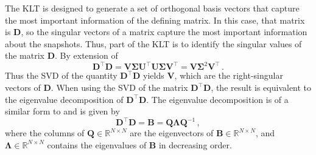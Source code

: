 The KLT is designed to generate a set of orthogonal basis vectors that capture 
the most important information of the defining matrix.  In this case, that 
matrix is $\mathbf{D}$, so the singular vectors of a matrix capture the most
important information about the snapshots.  Thus, part of the KLT is to identify 
the singular values of the matrix $\mathbf{D}$.  By extension of 
\begin{equation}
    \mathbf{D}^{\intercal}\mathbf{D}  = \mathbf{V} \mathbf{\Sigma} 
    \mathbf{U}^{\intercal} \mathbf{U} \mathbf{\Sigma} \mathbf{V}^{\intercal} = 
    \mathbf{V} \mathbf{\Sigma}^2 \mathbf{V}^{\intercal} \, .
    \label{eq:find_eigenvalues}
\end{equation}
Thus the SVD of the quantity $\mathbf{D}^{\intercal}\mathbf{D}$ yields 
$\mathbf{V}$, which are the right-singular vectors of $\mathbf{D}$.  When 
using the SVD of the matrix $\mathbf{D}^{\intercal}\mathbf{D}$, the result 
is equivalent to the eigenvalue decomposition of 
$\mathbf{D}^{\intercal}\mathbf{D}$.  The eigenvalue decomposition is of a similar form to 
 and is given by
\begin{equation}
    \mathbf{D}^{\intercal}\mathbf{D} = \mathbf{B} = 
    \mathbf{Q}\mathbf{\Lambda}\mathbf{Q}^{-1}\, ,
    \label{eq:eval_decomp}
\end{equation}
where the columns of $\mathbf{Q} \in \mathbb{R}^{N\times N}$ are the 
eigenvectors of $\mathbf{B} \in \mathbb{R}^{N\times N}$, and $\mathbf{\Lambda} 
\in \mathbb{R}^{N\times N}$ contains the eigenvalues of $\mathbf{B}$ in 
decreasing order. 

